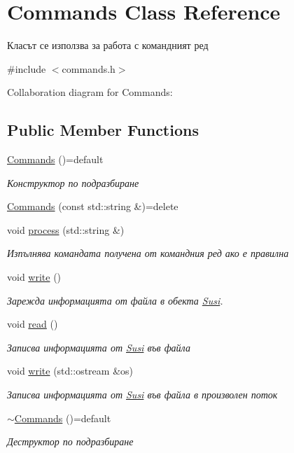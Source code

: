 \hypertarget{class_commands}{}\section{Commands Class Reference}
\label{class_commands}


Класът се използва за работа с командният ред  




{\ttfamily \#include $<$commands.\+h$>$}



Collaboration diagram for Commands\+:
\subsection*{Public Member Functions}
\begin{DoxyCompactItemize}
\item 
\hyperlink{class_commands_a5074950eaa028c7b44005a3c84870344}{Commands} ()=default
\begin{DoxyCompactList}\small\item\em Конструктор по подразбиране \end{DoxyCompactList}\item 
\hyperlink{class_commands_a50e97e2c1cc38b6b84252cac9af09f3d}{Commands} (const std\+::string \&)=delete
\item 
void \hyperlink{class_commands_aa9562e12c94ab654035a1c08bc04f377}{process} (std\+::string \&)
\begin{DoxyCompactList}\small\item\em Изпълнява командата получена от командния ред ако е правилна \end{DoxyCompactList}\item 
void \hyperlink{class_commands_a20c079b35574ed9f13dd29cee68f25f9}{write} ()
\begin{DoxyCompactList}\small\item\em Зарежда информацията от файла в обекта \hyperlink{class_susi}{Susi}. \end{DoxyCompactList}\item 
void \hyperlink{class_commands_acd316fdb9569d4b2a7860ca86d7af6c1}{read} ()
\begin{DoxyCompactList}\small\item\em Записва информацията от \hyperlink{class_susi}{Susi} във файла \end{DoxyCompactList}\item 
void \hyperlink{class_commands_a3a46d1e3934cfe1999476486473ad64c}{write} (std\+::ostream \&os)
\begin{DoxyCompactList}\small\item\em Записва информацията от \hyperlink{class_susi}{Susi} във файла в произволен поток \end{DoxyCompactList}\item 
\hyperlink{class_commands_a9c7815d0cedea1ccbac72eadc4bcab2d}{$\sim$\+Commands} ()=default
\begin{DoxyCompactList}\small\item\em Деструктор по подразбиране \end{DoxyCompactList}\end{DoxyCompactItemize}
